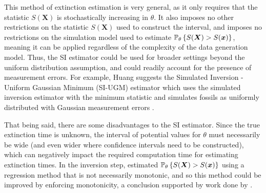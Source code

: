 This method of extinction estimation is very general, as it only requires that the statistic $S(\bm{X})$ is stochastically increasing in $\theta$. It also imposes no other restrictions on the statistic $S(\bm{X})$ used to construct the interval, and imposes no restrictions on the simulation model used to estimate $\mathbb{P}_\theta\left\{S(\bm{X}) > S(\bm{x})\right\}$, meaning it can be applied regardless of the complexity of the data generation model. Thus, the SI estimator could be used for broader settings beyond the uniform distribution assumption, and could readily account for the presence of measurement errors. For example, Huang suggests the Simulated Inversion - Uniform Gaussian Minimum (SI-UGM) estimator which uses the simulated inversion estimator with the minimum statistic and simulates fossils as uniformly distributed with Gaussian measurement errors \citep{Huang2019}. 

That being said, there are some disadvantages to the SI estimator. Since the true extinction time is unknown, the interval of potential values for $\theta$ must necessarily be wide (and even wider where confidence intervals need to be constructed), which can negatively impact the required computation time for estimating extinction times. In the inversion step, \citet{Huang2019} estimated $\mathbb{P}_\theta\left\{S(\bm{X}) > S(\bm{x})\right\}$ using a regression method that is not necessarily monotonic, and so this method could be improved by enforcing monotonicity, a conclusion supported by work done by \citet{King2020}.